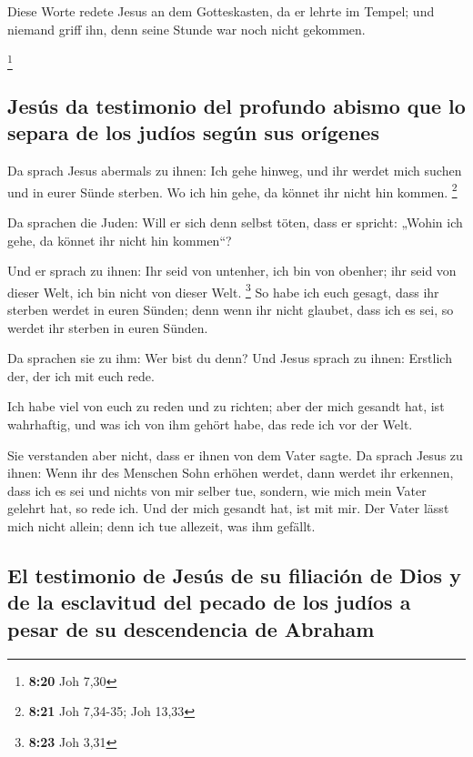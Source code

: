  Diese Worte redete Jesus an dem Gotteskasten, da er
lehrte im Tempel; und niemand griff ihn, denn seine Stunde war noch
nicht gekommen.

\footnote{\textbf{8:20} Joh 7,30}

\hypertarget{jesuxfas-da-testimonio-del-profundo-abismo-que-lo-separa-de-los-juduxedos-seguxfan-sus-oruxedgenes}{%
\subsection{Jesús da testimonio del profundo abismo que lo separa de los
judíos según sus
orígenes}\label{jesuxfas-da-testimonio-del-profundo-abismo-que-lo-separa-de-los-juduxedos-seguxfan-sus-oruxedgenes}}

 Da sprach Jesus abermals zu ihnen: Ich gehe hinweg, und
ihr werdet mich suchen und in eurer Sünde sterben. Wo ich hin gehe, da
könnet ihr nicht hin kommen. \footnote{\textbf{8:21} Joh 7,34-35; Joh
  13,33}

 Da sprachen die Juden: Will er sich denn selbst töten,
dass er spricht: „Wohin ich gehe, da könnet ihr nicht hin kommen``?

 Und er sprach zu ihnen: Ihr seid von untenher, ich bin
von obenher; ihr seid von dieser Welt, ich bin nicht von dieser Welt.
\footnote{\textbf{8:23} Joh 3,31}  So habe ich euch
gesagt, dass ihr sterben werdet in euren Sünden; denn wenn ihr nicht
glaubet, dass ich es sei, so werdet ihr sterben in euren Sünden.

 Da sprachen sie zu ihm: Wer bist du denn? Und Jesus
sprach zu ihnen: Erstlich der, der ich mit euch rede.

 Ich habe viel von euch zu reden und zu richten; aber der
mich gesandt hat, ist wahrhaftig, und was ich von ihm gehört habe, das
rede ich vor der Welt.

 Sie verstanden aber nicht, dass er ihnen von dem Vater
sagte.  Da sprach Jesus zu ihnen: Wenn ihr des Menschen
Sohn erhöhen werdet, dann werdet ihr erkennen, dass ich es sei und
nichts von mir selber tue, sondern, wie mich mein Vater gelehrt hat, so
rede ich.  Und der mich gesandt hat, ist mit mir. Der
Vater lässt mich nicht allein; denn ich tue allezeit, was ihm gefällt.

\hypertarget{el-testimonio-de-jesuxfas-de-su-filiaciuxf3n-de-dios-y-de-la-esclavitud-del-pecado-de-los-juduxedos-a-pesar-de-su-descendencia-de-abraham}{%
\subsection{El testimonio de Jesús de su filiación de Dios y de la
esclavitud del pecado de los judíos a pesar de su descendencia de
Abraham}\label{el-testimonio-de-jesuxfas-de-su-filiaciuxf3n-de-dios-y-de-la-esclavitud-del-pecado-de-los-juduxedos-a-pesar-de-su-descendencia-de-abraham}}


